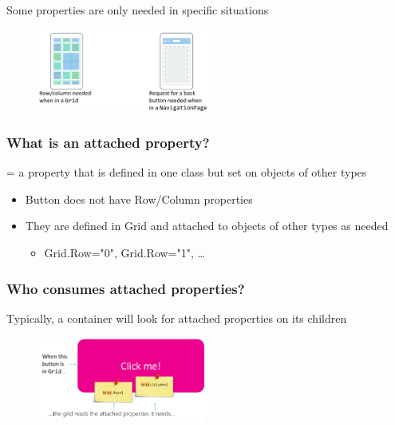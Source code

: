 \documentclass{article}
\begin{document}
Some properties are only needed in specific situations

\begin{figure}[H]
    \centering
    \includegraphics[width=0.5\textwidth]{xaml-attachedproperties.png}
    \caption{}
\end{figure}

\subsubsection{What is an attached property?}

= a property that is defined in one class but set on objects of other types

\begin{itemize}
    \item Button does not have Row/Column properties
    \item They are defined in Grid and attached to objects of other types as needed
    \begin{itemize}
        \item Grid.Row="0", Grid.Row="1", \dots
    \end{itemize}
\end{itemize}

\subsubsection{Who consumes attached properties?}

Typically, a container will look for attached properties on its children

\begin{figure}[H]
    \centering
    \includegraphics[width=0.5\textwidth]{xaml-attachedproperties2.png}
    \caption{}
\end{figure}
\end{document}
